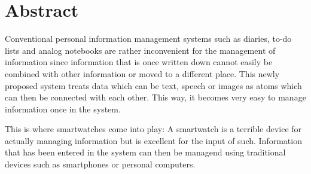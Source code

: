 \section*{Abstract}

\noindent Conventional personal information management systems such as diaries, to-do lists and analog notebooks are rather inconvenient for the management of information since information that is once written down cannot easily be combined with other information or moved to a different place. This newly proposed system treats data which can be text, speech or images as atoms which can then be connected with each other. This way, it becomes very easy to manage information once in the system.

This is where smartwatches come into play: A smartwatch is a terrible device for actually managing information but is excellent for the input of such. Information that has been entered in the system can then be managend using traditional devices such as smartphones or personal computers.
